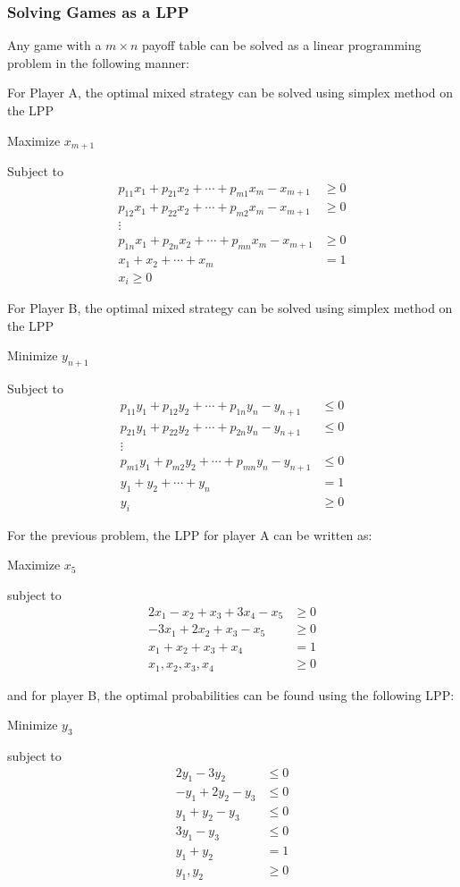 \documentclass[12pt]{article}
\begin{document}
\subsubsection{Solving Games as a LPP}
Any game with a $m\times n$ payoff table can be solved as a linear programming problem in the following manner:

For Player A, the optimal mixed strategy can be solved using simplex method on the LPP

Maximize $x_{m+1}$

Subject to 
\begin{align*}
  p_{11} x_1 + p_{21} x_2 + \cdots +p_{m1} x_m - x_{m+1} & \ge 0 \\
  p_{12} x_1 + p_{22} x_2 + \cdots +p_{m2} x_m - x_{m+1} & \ge 0 \\
  \vdots                                                         \\
  p_{1n} x_1 + p_{2n} x_2 + \cdots +p_{mn} x_m - x_{m+1} & \ge 0 \\
  x_1+x_2+\cdots+x_m                                  & = 1   \\
  x_i \ge 0 \tag{for $i=1,2,\ldots ,m$}
\end{align*}

For Player B, the optimal mixed strategy can be solved using simplex method on the LPP

Minimize $y_{n+1}$

Subject to 
\begin{align*}
  p_{11} y_1 + p_{12} y_2 + \cdots +p_{1n} y_n - y_{n+1} &\le 0 \\
  p_{21} y_1 + p_{22} y_2 + \cdots +p_{2n} y_n - y_{n+1} &\le 0 \\
  \vdots \\
  p_{m1} y_1 + p_{m2} y_2 + \cdots +p_{mn} y_n - y_{n+1} &\le 0 \\
  y_1+y_2+\cdots+y_n                                  &= 1 \\
  y_i                                                &\ge 0 \tag{for $i=1,2,\ldots ,n$}
\end{align*}

For the previous problem, the LPP for player A can be written as:

Maximize  $x_5$

subject to
\begin{align*}
  2x_1-x_2+x_3+3 x_4-x_5 &\ge 0 \\
  -3x_1+2x_2+x_3-x_5     &\ge 0 \\
  x_1+x_2+x_3+x_4        &= 1 \\
  x_1,x_2,x_3,x_4        &\ge 0
\end{align*}

and for player B, the optimal probabilities can be found using the following LPP:

Minimize   $y_3$

subject to
\begin{align*}
  2y_1-3y_2     &\le 0 \\
  -y_1+2y_2-y_3 &\le 0 \\
  y_1+y_2-y_3   &\le 0 \\
  3y_1-y_3      &\le 0 \\
  y_1+y_2       &= 1 \\
  y_1,y_2       &\ge 0
\end{align*}
\end{document}
